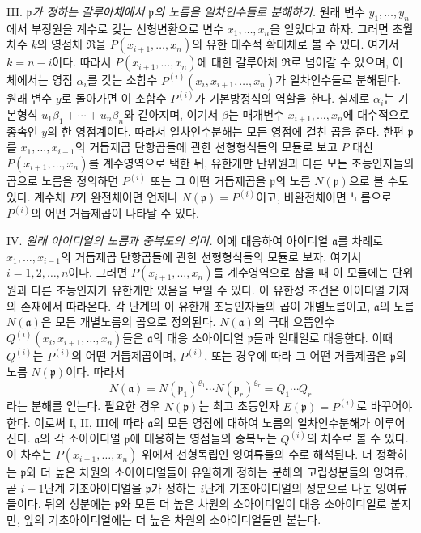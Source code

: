 III. \emph{\(\mathfrak p\)가 정하는 갈루아체에서 \(\mathfrak p\)의 노름을 일차인수들로 분해하기.} 원래 변수 \(y_1,\ldots,y_n\)에서 부정원을 계수로 갖는 선형변환으로 변수 \(x_1,\ldots,x_n\)을 얻었다고 하자. 그러면 초월차수 \(k\)의 영점체 \(\mathfrak R\)을 \(P(x_{i+1},\ldots,x_n)\)의 유한 대수적 확대체로 볼 수 있다. 여기서 \(k=n-i\)이다. 따라서 \(P(x_{i+1},\ldots,x_n)\)에 대한 갈루아체 \(\overline{\mathfrak R}\)로 넘어갈 수 있으며, 이 체에서는 영점 \(\alpha_i\)를 갖는 소함수 \(P^{(i)}(x_i,x_{i+1},\ldots,x_n)\)가 일차인수들로 분해된다. 원래 변수 \(y\)로 돌아가면 이 소함수 \(P^{(i)}\)가 기본방정식의 역할을 한다. 실제로 \(\alpha_i\)는 기본형식 \(u_1\beta_1+\cdots+u_n\beta_n\)와 같아지며, 여기서 \(\beta\)는 매개변수 \(x_{i+1},\ldots,x_n\)에 대수적으로 종속인 \(y\)의 한 영점계이다. 따라서 일차인수분해는 모든 영점에 걸친 곱을 준다. 한편 \(\mathfrak p\)를 \(x_1,\ldots,x_{i-1}\)의 거듭제곱 단항곱들에 관한 선형형식들의 모듈로 보고 \(P\) 대신 \(P(x_{i+1},\ldots,x_n)\)를 계수영역으로 택한 뒤, 유한개만 단위원과 다른 모든 초등인자들의 곱으로 노름을 정의하면 \(P^{(i)}\) 또는 그 어떤 거듭제곱을 \(\mathfrak p\)의 노름 \(N(\mathfrak p)\)으로 볼 수도 있다. 계수체 \(P\)가 완전체이면 언제나 \(N(\mathfrak p)=P^{(i)}\)이고, 비완전체이면 노름으로 \(P^{(i)}\)의 어떤 거듭제곱이 나타날 수 있다.

IV. \emph{원래 아이디얼의 노름과 중복도의 의미.} 이에 대응하여 아이디얼 \(\mathfrak a\)를 차례로 \(x_1,\ldots,x_{i-1}\)의 거듭제곱 단항곱들에 관한 선형형식들의 모듈로 보자. 여기서 \(i=1,2,\ldots,n\)이다. 그러면 \(P(x_{i+1},\ldots,x_n)\)를 계수영역으로 삼을 때 이 모듈에는 단위원과 다른 초등인자가 유한개만 있음을 보일 수 있다. 이 유한성 조건은 아이디얼 기저의 존재에서 따라온다. 각 단계의 이 유한개 초등인자들의 곱이 개별노름이고, \(\mathfrak a\)의 노름 \(N(\mathfrak a)\)은 모든 개별노름의 곱으로 정의된다. \(N(\mathfrak a)\)의 극대 으뜸인수 \(Q^{(i)}(x_i,x_{i+1},\ldots,x_n)\)들은 \(\mathfrak a\)의 대응 소아이디얼 \(\mathfrak p\)들과 일대일로 대응한다. 이때 \(Q^{(i)}\)는 \(P^{(i)}\)의 어떤 거듭제곱이며, \(P^{(i)}\), 또는 경우에 따라 그 어떤 거듭제곱은 \(\mathfrak p\)의 노름 \(N(\mathfrak p)\)이다. 따라서
\[
N(\mathfrak a)=N(\mathfrak p_1)^{\varrho_1}\cdots N(\mathfrak p_r)^{\varrho_r}=Q_1\cdots Q_r
\]
라는 분해를 얻는다. 필요한 경우 \(N(\mathfrak p)\)는 최고 초등인자 \(E(\mathfrak p)=P^{(i)}\)로 바꾸어야 한다. 이로써 I, II, III에 따라 \(\mathfrak a\)의 모든 영점에 대하여 노름의 일차인수분해가 이루어진다. \(\mathfrak a\)의 각 소아이디얼 \(\mathfrak p\)에 대응하는 영점들의 중복도는 \(Q^{(i)}\)의 차수로 볼 수 있다. 이 차수는 \(P(x_{i+1},\ldots,x_n)\) 위에서 선형독립인 잉여류들의 수로 해석된다. 더 정확히는 \(\mathfrak p\)와 더 높은 차원의 소아이디얼들이 유일하게 정하는 분해의 고립성분들의 잉여류, 곧 \(i-1\)단계 기초아이디얼을 \(\mathfrak p\)가 정하는 \(i\)단계 기초아이디얼의 성분으로 나눈 잉여류들이다. 뒤의 성분에는 \(\mathfrak p\)와 모든 더 높은 차원의 소아이디얼이 대응 소아이디얼로 붙지만, 앞의 기초아이디얼에는 더 높은 차원의 소아이디얼들만 붙는다.

